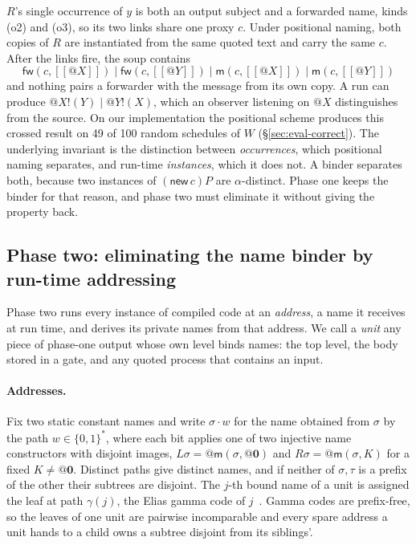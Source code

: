\documentclass[acmsmall,screen,review,anonymous]{acmart}
\makeatletter
\newcommand{\quo}[1]{@#1}
\newcommand{\out}[2]{#1!(#2)}
\newcommand{\nil}{\mathbf{0}}
\newcommand{\enc}[1]{[\![#1]\!]}
\newcommand{\mm}{\mathsf{m}}
\newcommand{\fw}{\mathsf{fw}}
\makeatother
\begin{document}
$R$'s single occurrence of $y$ is both an output subject and a forwarded
name, kinds (o2) and (o3), so its two links share one proxy $c$. Under
positional naming, both copies of $R$ are instantiated from the same quoted
text and carry the same $c$. After the links fire, the soup contains
\[
  \fw(c,\enc{\quo{X}}) \mid \fw(c,\enc{\quo{Y}}) \mid
  \mm(c,\enc{\quo{X}}) \mid \mm(c,\enc{\quo{Y}})
\]
and nothing pairs a forwarder with the message from its own copy. A run can
produce $\out{\quo{X}}{Y} \mid \out{\quo{Y}}{X}$, which an observer listening
on $\quo{X}$ distinguishes from the source. On our implementation the
positional scheme produces this crossed result on 49 of 100 random schedules
of $W$ (\S\ref{sec:eval-correct}). The underlying invariant is the
distinction between \emph{occurrences}, which positional naming separates,
and run-time \emph{instances}, which it does not. A binder separates both,
because two instances of $(\mathsf{new}\,c)P$ are $\alpha$-distinct. Phase one
keeps the binder for that reason, and phase two must eliminate it without
giving the property back.

\subsection{Phase two: eliminating the name binder by run-time addressing}
\label{sec:phase2}

Phase two runs every instance of compiled code at an \emph{address}, a name it
receives at run time, and derives its private names from that address. We
call a \emph{unit} any piece of phase-one output whose own level binds names:
the top level, the body stored in a gate, and any quoted process that
contains an input.

\paragraph{Addresses.} Fix two static constant names and write $\sigma\cdot w$
for the name obtained from $\sigma$ by the path $w \in \{0,1\}^{*}$, where
each bit applies one of two injective name constructors with disjoint images,
$L\sigma = \quo{\mm(\sigma,\quo{\nil})}$ and $R\sigma = \quo{\mm(\sigma,K)}$
for a fixed $K \neq \quo{\nil}$. Distinct paths give distinct names, and if
neither of $\sigma,\tau$ is a prefix of the other their subtrees are
disjoint. The $j$-th bound name of a unit is assigned the leaf at path
$\gamma(j)$, the Elias gamma code of $j$~\cite{Elias75}. Gamma codes are
prefix-free, so the leaves of one unit are pairwise incomparable and every
spare address a unit hands to a child owns a subtree disjoint from its
siblings'.
\end{document}
